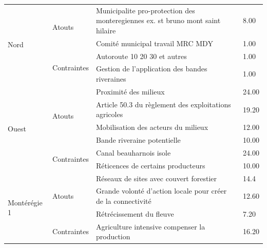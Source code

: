 \begin{table}[]
\begin{tabular}{m{}lm{}l}
\multirow{4}{*}{Nord}         & \multirow{2}{*}{Atouts}      & Municipalite pro-protection des monteregiennes ex. st bruno mont saint hilaire & 8.00  \\ \cline{3-4} 
                        &                              & Comité municipal travail MRC MDY                             & 1.00           \\ \cline{2-4} 
                        & \multirow{2}{*}{Contraintes} & Autoroute 10 20 30 et autres                                 & 1.00           \\ \cline{3-4} 
                        &                              & Gestion de l'application des bandes riveraines               & 1.00           \\ \hline
\multirow{6}{*}{Ouest}  & \multirow{4}{*}{Atouts}      & Proximité des milieux                                        & 24.00          \\ \cline{3-4} 
                        &                              & Article 50.3 du règlement des exploitations agricoles        & 19.20          \\ \cline{3-4} 
                        &                              & Mobilisation des acteurs du milieux                          & 12.00          \\ \cline{3-4} 
                        &                              & Bande riveraine potentielle                                  & 10.00          \\ \cline{2-4} 
                        & \multirow{2}{*}{Contraintes} & Canal beauharnois isole                                      & 24.00          \\ \cline{3-4} 
                        &                              & Réticences de certains producteurs                           & 10.00          \\ \hline
\multirow{5}{*}{Montérégie 1} & \multirow{3}{*}{Atouts}      & Réseaux de sites avec couvert forestier                                        & 14.4  \\ \cline{3-4} 
                        &                              & Grande volonté d'action locale pour créer de la connectivité & 12.60          \\ \cline{3-4} 
                        &                              & Rétrécissement du fleuve                                     & 7.20           \\ \cline{2-4} 
                              & \multirow{2}{*}{Contraintes} & Agriculture intensive compenser la production                                  & 16.20 \\ \cline{3-4} 

\end{tabular}
\end{table}
